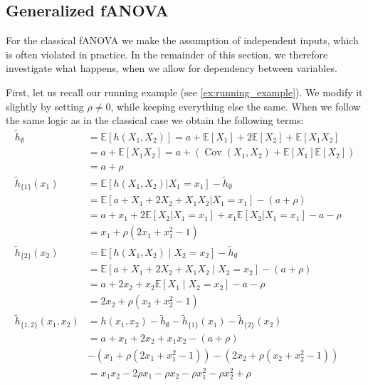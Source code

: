 \subsection{Generalized fANOVA}
For the classical fANOVA we make the assumption of independent inputs, which is often violated in practice. In the remainder of this section, we therefore investigate what happens, when we allow for dependency between variables.\par
First, let us recall our running example (see \autoref{ex:running_example}). We modify it slightly by setting $\rho\neq 0$, while keeping everything else the same. When we follow the same logic as in the classical case we obtain the following terms:
\begin{align*}
\tilde{h}_{\emptyset} &= \mathbb{E}[h(X_1, X_2)] 
= a + \mathbb{E}[X_1] + 2\mathbb{E}[X_2] + \mathbb{E}[X_1 X_2] \\
&= a + \mathbb{E}[X_1 X_2] 
= a + \left( \operatorname{Cov}(X_1, X_2) + \mathbb{E}[X_1]\mathbb{E}[X_2] \right) \\
&= a + \rho \\[0.5em]
\tilde{h}_{\{1\}}(x_1) 
&= \mathbb{E}[h(X_1, X_2) | X_1 = x_1] - \tilde{h}_{\emptyset} \\
&= \mathbb{E}[a + X_1 + 2X_2 + X_1 X_2 | X_1 = x_1] - (a + \rho) \\
&= a + x_1 + 2\mathbb{E}[X_2 | X_1 = x_1] + x_1 \mathbb{E}[X_2 | X_1 = x_1] - a - \rho \\
&= x_1 + \rho(2x_1 + x_1^2 - 1) \\[0.5em]
\tilde{h}_{\{2\}}(x_2) 
&= \mathbb{E}[h(X_1, X_2) \mid X_2 = x_2] - \tilde{h}_{\emptyset} \\
&= \mathbb{E}[a + X_1 + 2X_2 + X_1 X_2 \mid X_2 = x_2] - (a + \rho) \\
&= a + 2x_2 + x_2 \mathbb{E}[X_1 \mid X_2 = x_2] - a - \rho \\
&= 2x_2 + \rho(x_2 + x_2^2 - 1) \\[0.5em]
\tilde{h}_{\{1,2\}}(x_1, x_2) 
&= h(x_1, x_2) - \tilde{h}_{\emptyset} - \tilde{h}_{\{1\}}(x_1) - \tilde{h}_{\{2\}}(x_2) \\
&= a + x_1 + 2x_2 + x_1 x_2 - (a + \rho) \\
&- (x_1 + \rho(2x_1 + x_1^2 - 1)) - (2x_2 + \rho(x_2 + x_2^2 - 1))\\
&= x_1 x_2 - 2\rho x_1 - \rho x_2  - \rho x_1^2  - \rho x_2^2 + \rho
\end{align*}
